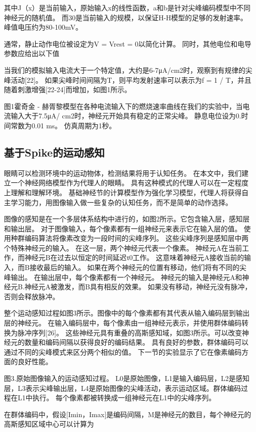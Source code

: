 \documentclass[a4paper,12pt]{ctexart}
\begin{document}
其中J（x）是当前输入，原始输入x的线性函数，a和b是针对尖峰编码模型中不同神经元的随机值。 而30是当前输入的规模，以保证H-H模型的足够的发射速率。 峰值电压约为80-100mV。

通常，静止动作电位被设定为V = Vrest = 0以简化计算。 同时，其他电位和电导参数应给出以下值

当我们的模拟输入电流大于一个特定值，大约是6-7μA/cm2时，观察到有规律的尖峰活动[22]。 如果尖峰时间间隔为T，则平均发射速率可以表示为f = 1 / T，并且随着刺激增强[22-24]而增加，如图1所示。

图1霍奇金 - 赫胥黎模型在各种电流输入下的燃烧速率曲线在我们的实验中，当电流输入大于7.5μA/ cm2时，神经元开始具有稳定的正常尖峰。 静息电位设为0.时间常数为0.01 ms。 仿真周期为1秒。

\subsection{基于Spike的运动感知}
眼睛可以检测环境中的运动物体，检测结果将用于认知任务。 在本文中，我们建立一个神经网络模型作为代理人的眼睛。 具有这种模式的代理人可以在一定程度上理解和理解环境。 基础神经节的计算模型作为强化学习模型，代理人将获得自主学习能力，用图像输入做一些复杂的认知任务，而不是简单的动作选择。

图像的感知是在一个多层体系结构中进行的，如图2所示。它包含输入层，感知层和输出层。 对于图像输入，每个像素都有一组神经元来表示它在输入层的值。 使用种群编码算法将像素改变为一段时间的尖峰序列。 这些尖峰序列是感知层中两个特殊神经元的输入。 在这一层，两个神经元代表一个像素。 神经元A在当前工作，而神经元B在过去以恒定的时间延迟τ0工作。 这意味着神经元A接收当前的输入，而B接收最后的输入。 如果在两个神经元的位置有移动，他们将有不同的尖峰输出。 在输出层中，每个像素都有一个神经元。 神经元的输入是神经元A和神经元B.神经元A被激发，而B具有相反的效果。 如果没有移动，神经元没有脉冲，否则会释放脉冲。

整个运动感知过程如图3所示。图像中的每个像素都有其代表从输入编码层到输出层的神经元。 在输入编码层中，每个像素由一组神经元表示，并使用群体编码转换为脉冲序列[26]。 这些神经元具有重叠的高斯感知域，如图3所示。可以改变神经元的数量和编码间隔以获得良好的编码结果。 具有良好的参数，群体编码可以通过不同的尖峰模式来区分两个相似的值。 下一节的实验显示了它在像素编码方面的良好性能。

图3.原始图像输入的运动感知过程。 L0是原始图像，L1是输入编码层，L2是感知层，L3表示尖峰输出层，L4是原始图像的尖峰活动，表示运动区域。群体编码过程在L1中执行。 每个像素都被转换成一组神经元在L1中的尖峰序列。

在群体编码中，假设[Imin，Imax]是编码间隔，M是神经元的数目，每个神经元的高斯感知区域中心可以计算为
\end{document}

